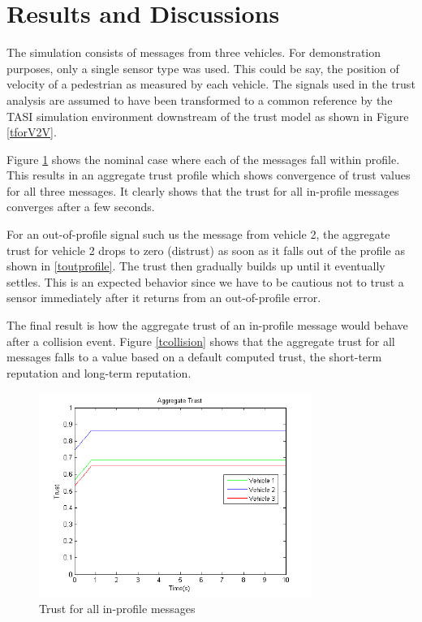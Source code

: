 \documentclass[conference]{IEEEtran}
\begin{document}
\section{Results and Discussions}
The simulation consists of messages from three vehicles. For demonstration purposes, only a single sensor type was used. This could be say, the position of velocity of a pedestrian as measured by each vehicle. The signals used in the trust analysis are assumed to have been transformed to a common reference by the TASI simulation environment downstream of the trust model as shown in Figure \ref{tforV2V}. 


Figure \ref{tnormal} shows the nominal case where each of the messages fall within profile. This results in an aggregate trust profile which shows convergence of trust values for all three messages. It clearly shows that the trust for all in-profile messages converges after a few seconds.

For an out-of-profile signal such us the message from vehicle 2, the aggregate trust for vehicle 2 drops to zero (distrust) as soon as it falls out of the profile as shown in \ref{toutprofile}. The trust then gradually builds up until it eventually settles. This is an expected behavior since we have to be cautious not to trust a sensor immediately after it returns from an out-of-profile error.

The final result is how the aggregate trust of an in-profile message would behave after a collision event. Figure \ref{tcollision} shows that the aggregate trust for all messages falls to a value based on a default computed trust, the short-term reputation and long-term reputation. 

\begin{figure}[h]
\centering
\includegraphics[width=3.5in]{trust_norminal.png}
\caption{Trust for all in-profile messages}
\label{tnormal}
\end{figure}
\end{document}
